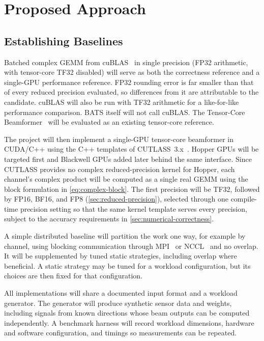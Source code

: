 \section{Proposed Approach}
\label{sec:proposed-approach}


\subsection{Establishing Baselines}
\label{sec:establishing-baselines}

Batched complex GEMM from cuBLAS~\cite{cublasDocs} in single precision (FP32 arithmetic, with tensor-core TF32 disabled) will serve as both the correctness reference and a single-GPU performance reference. FP32 rounding error is far smaller than that of every reduced precision evaluated, so differences from it are attributable to the candidate. cuBLAS will also be run with TF32 arithmetic for a like-for-like performance comparison. BATS itself will not call cuBLAS. The Tensor-Core Beamformer~\cite{oostrum2025tcbf} will be evaluated as an existing tensor-core reference.

The project will then implement a single-GPU tensor-core beamformer in CUDA/C++ using the C++ templates of CUTLASS~3.x~\cite{cutlass}. Hopper GPUs will be targeted first and Blackwell GPUs added later behind the same interface. Since CUTLASS provides no complex reduced-precision kernel for Hopper, each channel's complex product will be computed as a single real GEMM using the block formulation in \cref{eq:complex-block}. The first precision will be TF32, followed by FP16, BF16, and FP8 (\cref{sec:reduced-precision}), selected through one compile-time precision setting so that the same kernel template serves every precision, subject to the accuracy requirements in \cref{sec:numerical-correctness}.

A simple distributed baseline will partition the work one way, for example by channel, using blocking communication through MPI~\cite{mpiStandard} or NCCL~\cite{ncclDocs} and no overlap. It will be supplemented by tuned static strategies, including overlap where beneficial. A static strategy may be tuned for a workload configuration, but its choices are then fixed for that configuration.

All implementations will share a documented input format and a workload generator. The generator will produce synthetic sensor data and weights, including signals from known directions whose beam outputs can be computed independently. A benchmark harness will record workload dimensions, hardware and software configuration, and timings so measurements can be repeated.

